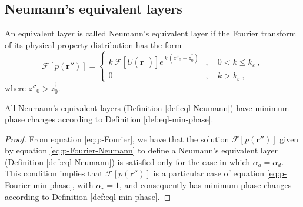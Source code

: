 
\subsection{Neumann's equivalent layers}

\begin{definition}
	An equivalent layer is called Neumann's equivalent layer if the Fourier transform of its physical-property distribution has 
	the form
	\begin{equation}
		\mathcal{F} [ p(\mathbf{r}'') ] =
		\begin{cases}
			k \, \mathcal{F} [ U(\mathbf{r}^{\dagger}) ] 
			e^{\, k \, (z''_{0} - z^{\dagger}_{0})} & , 
			\quad 0 < k \le k_{\varepsilon} \: , \\
			0 & , \quad k > k_{\varepsilon} \: ,
		\end{cases} 
		\label{eq:p-Fourier-Neumann}
	\end{equation}
	where $z''_{0} > z^{\dagger}_{0}$.
	\label{def:eql-Neumann}
\end{definition}
\begin{lemma}
	All Neumann's equivalent layers (Definition \ref{def:eql-Neumann}) have 
	minimum phase changes according to Definition \ref{def:eql-min-phase}.
	\label{lemma:eql-Neumann}
\end{lemma}
\begin{proof}
	From equation \ref{eq:p-Fourier}, we have that the solution $\mathcal{F} [ p(\mathbf{r}'') ]$ 
	given by equation \ref{eq:p-Fourier-Neumann} to define a Neumann's equivalent layer
	(Definition \ref{def:eql-Neumann}) is satisfied 
	only for the case in which $\alpha_{a} = \alpha_{d}$. This condition implies that 
	$\mathcal{F} [ p(\mathbf{r}'') ]$ is a particular case of equation \ref{eq:p-Fourier-min-phase},
	with $\alpha_{r} = 1$, and consequently has minimum phase changes
	according to Definition \ref{def:eql-min-phase}.
\end{proof}

